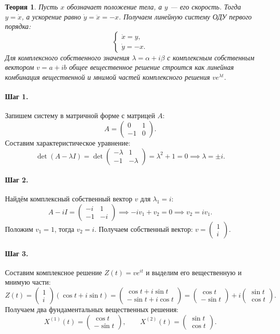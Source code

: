 \documentclass[12pt,a4paper]{article}
\theoremstyle{solution}
\newtheorem*{theory}{Теория}
\newcommand{\step}[1]{\paragraph{Шаг #1.}}
\begin{document}
\begin{theory}
Пусть $x$ обозначает положение тела, а $y$ — его скорость. Тогда $y = \dot{x}$, а ускорение равно $\dot{y} = \ddot{x} = -x$. Получаем линейную систему ОДУ первого порядка:
\[
\begin{cases}
\dot{x} = y, \\
\dot{y} = -x.
\end{cases}
\]
Для комплексного собственного значения $\lambda = \alpha + i\beta$ с комплексным собственным вектором $v = a + ib$ общее вещественное решение строится как линейная комбинация вещественной и мнимой частей комплексного решения $v e^{\lambda t}$.
\end{theory}

\step{1} Запишем систему в матричной форме с матрицей $A$:
\[
A = \begin{pmatrix} 0 & 1 \\ -1 & 0 \end{pmatrix}.
\]
Составим характеристическое уравнение:
\[
\det(A - \lambda I) = \det \begin{pmatrix} -\lambda & 1 \\ -1 & -\lambda \end{pmatrix} = \lambda^2 + 1 = 0 \implies \lambda = \pm i.
\]

\step{2} Найдём комплексный собственный вектор $v$ для $\lambda_1 = i$:
\[
A - iI = \begin{pmatrix} -i & 1 \\ -1 & -i \end{pmatrix} \implies -i v_1 + v_2 = 0 \implies v_2 = i v_1.
\]
Положим $v_1 = 1$, тогда $v_2 = i$. Получаем собственный вектор: $v = \begin{pmatrix} 1 \\ i \end{pmatrix}$.

\step{3} Составим комплексное решение $Z(t) = v e^{it}$ и выделим его вещественную и мнимую части:
\[
Z(t) = \begin{pmatrix} 1 \\ i \end{pmatrix} (\cos t + i\sin t) = \begin{pmatrix} \cos t + i\sin t \\ -\sin t + i\cos t \end{pmatrix} = \begin{pmatrix} \cos t \\ -\sin t \end{pmatrix} + i \begin{pmatrix} \sin t \\ \cos t \end{pmatrix}.
\]
Получаем два фундаментальных вещественных решения:
\[
X^{(1)}(t) = \begin{pmatrix} \cos t \\ -\sin t \end{pmatrix}, \qquad X^{(2)}(t) = \begin{pmatrix} \sin t \\ \cos t \end{pmatrix}.
\]
\end{document}
